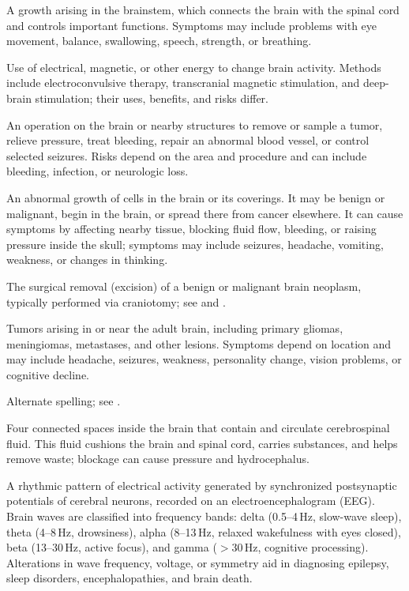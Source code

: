  A growth arising in the brainstem, which connects the brain with the spinal cord and controls important functions. Symptoms may include problems with eye movement, balance, swallowing, speech, strength, or breathing.

 Use of electrical, magnetic, or other energy to change brain activity. Methods include electroconvulsive therapy, transcranial magnetic stimulation, and deep-brain stimulation; their uses, benefits, and risks differ.

 An operation on the brain or nearby structures to remove or sample a tumor, relieve pressure, treat bleeding, repair an abnormal blood vessel, or control selected seizures. Risks depend on the area and procedure and can include bleeding, infection, or neurologic loss.

 An abnormal growth of cells in the brain or its coverings. It may be benign or malignant, begin in the brain, or spread there from cancer elsewhere. It can cause symptoms by affecting nearby tissue, blocking fluid flow, bleeding, or raising pressure inside the skull; symptoms may include seizures, headache, vomiting, weakness, or changes in thinking.

 The surgical removal (excision) of a benign or malignant brain neoplasm, typically performed via craniotomy; see  and .

 Tumors arising in or near the adult brain, including primary gliomas, meningiomas, metastases, and other lesions. Symptoms depend on location and may include headache, seizures, weakness, personality change, vision problems, or cognitive decline.

 Alternate spelling; see .

 Four connected spaces inside the brain that contain and circulate cerebrospinal fluid. This fluid cushions the brain and spinal cord, carries substances, and helps remove waste; blockage can cause pressure and hydrocephalus.

 A rhythmic pattern of electrical activity generated by synchronized postsynaptic potentials of cerebral neurons, recorded on an electroencephalogram (EEG). Brain waves are classified into frequency bands: delta (0.5--4\,Hz, slow-wave sleep), theta (4--8\,Hz, drowsiness), alpha (8--13\,Hz, relaxed wakefulness with eyes closed), beta (13--30\,Hz, active focus), and gamma ($> 30$\,Hz, cognitive processing). Alterations in wave frequency, voltage, or symmetry aid in diagnosing epilepsy, sleep disorders, encephalopathies, and brain death.

